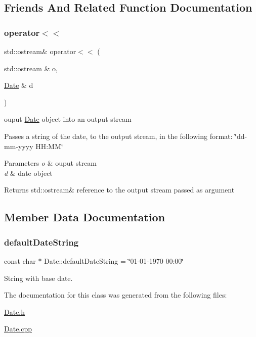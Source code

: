 \subsection{Friends And Related Function Documentation}
\mbox{\label{classDate_a2f114c7aa1398dac0f21b888bcb40f3e}} 
\subsubsection{\texorpdfstring{operator$<$$<$}{operator<<}}
{\footnotesize\ttfamily std\+::ostream\& operator$<$$<$ (\begin{DoxyParamCaption}\item[{std\+::ostream \&}]{o,  }\item[{\mbox{\hyperlink{classDate}{Date}} \&}]{d }\end{DoxyParamCaption})\hspace{0.3cm}{\ttfamily [friend]}}



ouput \mbox{\hyperlink{classDate}{Date}} object into an output stream 

Passes a string of the date, to the output stream, in the following format\+: \char`\"{}dd-\/mm-\/yyyy H\+H\+:\+M\+M\char`\"{}


\begin{DoxyParams}{Parameters}
{\em o} & ouput stream \\
\hline
{\em d} & date object \\
\hline
\end{DoxyParams}
\begin{DoxyReturn}{Returns}
std\+::ostream\& reference to the output stream passed as argument 
\end{DoxyReturn}


\subsection{Member Data Documentation}
\mbox{\label{classDate_ac3833dc0b7e3f62bac56195d48522f71}} 
\subsubsection{\texorpdfstring{default\+Date\+String}{defaultDateString}}
{\footnotesize\ttfamily const char $\ast$ Date\+::default\+Date\+String = \char`\"{}01-\/01-\/1970 00\+:00\char`\"{}\hspace{0.3cm}{\ttfamily [static]}}

String with base date. 

The documentation for this class was generated from the following files\+:\begin{DoxyCompactItemize}
\item 
\mbox{\hyperlink{Date_8h}{Date.\+h}}\item 
\mbox{\hyperlink{Date_8cpp}{Date.\+cpp}}\end{DoxyCompactItemize}
